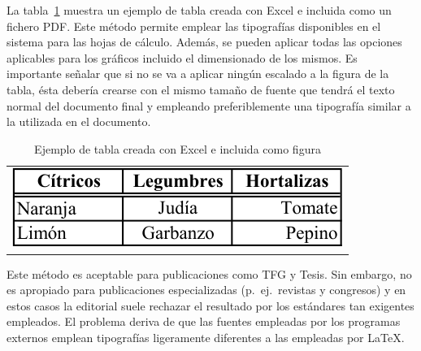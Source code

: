 \documentclass[11pt,a4paper]{article}
\begin{document}
La tabla~\ref{tab:figura} muestra un ejemplo de tabla creada con \textsf{Excel} e incluida como un fichero \textsf{PDF}. Este método permite emplear las tipografías disponibles en el sistema para las hojas de cálculo. Además, se pueden aplicar todas las opciones aplicables para los gráficos incluido el dimensionado de los mismos. Es importante señalar que si no se va a aplicar ningún escalado a la figura de la tabla, ésta debería crearse con el mismo tamaño de fuente que tendrá el texto normal del documento final y empleando preferiblemente una tipografía similar a la utilizada en el documento.

\begin{table}[H]%
	\centering
	\caption[Tabla \textsf{Excel}]{Ejemplo de tabla creada con \textsf{Excel} e incluida como figura}
	\label{tab:figura}
	\begin{tabular}{c}
		\includegraphics{alimentos}
	\end{tabular}
\end{table}

Este método es aceptable para publicaciones como TFG y Tesis. Sin embargo, no es apropiado para publicaciones especializadas (p.~ej.\ revistas y congresos) y en estos casos la editorial suele rechazar el resultado por los estándares tan exigentes empleados. El problema deriva de que las fuentes empleadas por los programas externos emplean tipografías ligeramente diferentes a las empleadas por \LaTeX.
\end{document}
